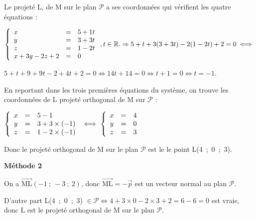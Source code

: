 \documentclass[10pt]{article}
\providecommand{\R}{\mathbb{R}}
\providecommand{\vect}[1]{\overrightarrow{#1}}
\begin{document}
\begin{enumerate}
Le projeté L,  de M sur le plan $\mathcal P$ a ses coordonnées qui vérifient les quatre équations :

$\left\{\begin{array}{l c l}
x	&=&5 + 1t\\
y 	&=&3 + 3t\\
z	&=&1 - 2t\\
x + 3y - 2z + 2&=&0
\end{array}\right. , t \in \R. \Rightarrow 5 + t  + 3(3 + 3t) - 2(1 - 2t) + 2 = 0 \iff$

$5 + t + 9 + 9t - 2 + 4t + 2 = 0 \iff 14t  + 14 = 0 \iff t + 1 = 0 \iff t = - 1$.

En reportant dans les trois premières équations du système, on trouve les coordonnées de L projeté orthogonal de M sur $\mathcal P$ :

$\left\{\begin{array}{l c l}
x	&=&5 - 1\\
y 	&=&3 + 3\times (- 1)\\
z	&=&1 - 2\times (- 1)\\
\end{array}\right. \iff \left\{\begin{array}{l c l}
x	&=&4\\
y 	&=&0\\
z	&=&3\\
\end{array}\right.$

Donc le projeté orthogonal de M sur le plan $\mathcal P$ est le le point L(4~;~0~;~3).
\end{enumerate}

\textbf{Méthode 2}

On a $\vect{\text{ML}}(-1~;~- 3~;~2)$, donc $\vect{\text{ML}} = - \vect{p}$ est un vecteur normal au plan $\mathcal{P}$.

D'autre part L(4~;~0~;~3) $\in \mathcal{P} \iff 4 + 3 \times 0 - 2 \times 3 + 2 = 6 - 6 = 0$ est vraie, donc L est le projeté orthogonal de M sur le plan $\mathcal P$.
\bigskip
\end{document}
